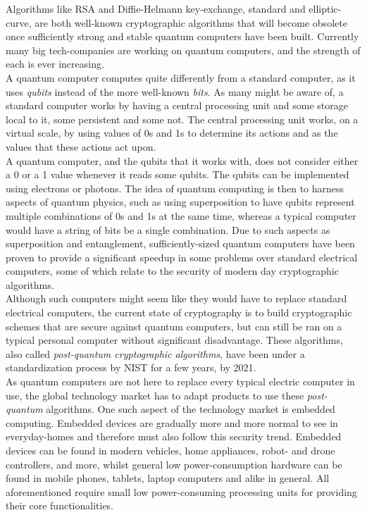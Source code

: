 Algorithms like RSA and Diffie-Helmann key-exchange, standard and elliptic-curve, are both well-known cryptographic algorithms that will become obsolete once sufficiently strong and stable quantum computers have been built. Currently many big tech-companies are working on quantum computers, and the strength of each is ever increasing.\medskip\\
A quantum computer computes quite differently from a standard computer, as it uses \emph{qubits} instead of the more well-known \emph{bits}. As many might be aware of, a standard computer works by having a central processing unit and some storage local to it, some persistent and some not. The central processing unit works, on a virtual scale, by using values of 0s and 1s to determine its actions and as the values that these actions act upon.\medskip\\
A quantum computer, and the qubits that it works with, does not consider either a 0 or a 1 value whenever it reads some qubits. The qubits can be implemented using electrons or photons. The idea of quantum computing is then to harness aspects of quantum physics, such as using superposition to have qubits represent multiple combinations of 0s and 1s at the same time, whereas a typical computer would have a string of bits be a single combination. Due to such aspects as superposition and entanglement, sufficiently-sized quantum computers have been proven to provide a significant speedup in some problems over standard electrical computers, some of which relate to the security of modern day cryptographic algorithms.\medskip\\
Although such computers might seem like they would have to replace standard electrical computers, the current state of cryptography is to build cryptographic schemes that are secure against quantum computers, but can still be ran on a typical personal computer without significant disadvantage. These algorithms, also called \emph{post-quantum cryptographic algorithms}, have been under a standardization process by NIST for a few years, by 2021.\medskip\\
As quantum computers are not here to replace every typical electric computer in use, the global technology market has to adapt products to use these \emph{post-quantum} algorithms. One such aspect of the technology market is embedded computing. Embedded devices are gradually more and more normal to see in everyday-homes and therefore must also follow this security trend. Embedded devices can be found in modern vehicles, home appliances, robot- and drone controllers, and more, whilst general low power-consumption hardware can be found in mobile phones, tablets, laptop computers and alike in general. All aforementioned require small low power-consuming processing units for providing their core functionalities.\medskip\\
